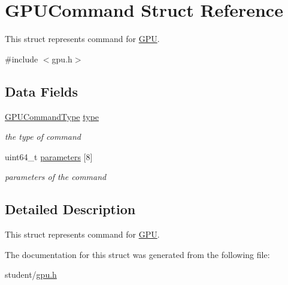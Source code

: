 \hypertarget{structGPUCommand}{}\section{G\+P\+U\+Command Struct Reference}
\label{structGPUCommand}


This struct represents command for \hyperlink{structGPU}{G\+PU}.  




{\ttfamily \#include $<$gpu.\+h$>$}

\subsection*{Data Fields}
\begin{DoxyCompactItemize}
\item 
\mbox{\label{structGPUCommand_acd0826c4736e3a3275e99b359f9d99aa}} 
\hyperlink{gpu_8h_a0e570b421c70c09be4d05c1c0ac49a02}{G\+P\+U\+Command\+Type} \hyperlink{structGPUCommand_acd0826c4736e3a3275e99b359f9d99aa}{type}
\begin{DoxyCompactList}\small\item\em the type of command \end{DoxyCompactList}\item 
\mbox{\label{structGPUCommand_a1c5e80394a5f4183597746a3de06357e}} 
uint64\+\_\+t \hyperlink{structGPUCommand_a1c5e80394a5f4183597746a3de06357e}{parameters} \mbox{[}8\mbox{]}
\begin{DoxyCompactList}\small\item\em parameters of the command \end{DoxyCompactList}\end{DoxyCompactItemize}


\subsection{Detailed Description}
This struct represents command for \hyperlink{structGPU}{G\+PU}. 

The documentation for this struct was generated from the following file\+:\begin{DoxyCompactItemize}
\item 
student/\hyperlink{gpu_8h}{gpu.\+h}\end{DoxyCompactItemize}
